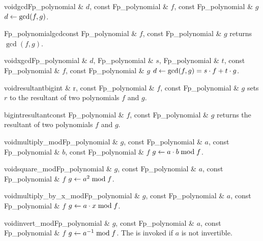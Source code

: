 
\begin{fcode}{void}{gcd}{Fp_polynomial & $d$, const Fp_polynomial & $f$, const Fp_polynomial & $g$}
  $d \leftarrow \gcd(f, g)$.
\end{fcode}

\begin{fcode}{Fp_polynomial}{gcd}{const Fp_polynomial & $f$, const Fp_polynomial & $g$}
  returns $\gcd(f, g)$.
\end{fcode}

\begin{fcode}{void}{xgcd}{Fp_polynomial & $d$, Fp_polynomial & $s$, Fp_polynomial & $t$,
    const Fp_polynomial & $f$, const Fp_polynomial & $g$}%
  $d \leftarrow \gcd(f, g) = s \cdot f + t \cdot g$.
\end{fcode}

\begin{fcode}{void}{resultant}{bigint & r, const Fp_polynomial & $f$, const Fp_polynomial & $g$}
  sets $r$ to the resultant of two polynomials $f$ and $g$.
\end{fcode}

\begin{fcode}{bigint}{resultant}{const Fp_polynomial & $f$, const Fp_polynomial & $g$}
  returns the resultant of two polynomials $f$ and $g$.
\end{fcode}



\begin{fcode}{void}{multiply_mod}{Fp_polynomial & $g$, const Fp_polynomial & $a$,
    const Fp_polynomial & $b$, const Fp_polynomial & $f$}%
  $g \leftarrow a \cdot b \bmod f$.
\end{fcode}

\begin{fcode}{void}{square_mod}{Fp_polynomial & $g$, const Fp_polynomial & $a$, const Fp_polynomial & $f$}
  $g \leftarrow a^2 \bmod f$.
\end{fcode}

\begin{fcode}{void}{multiply_by_x_mod}{Fp_polynomial & $g$, const Fp_polynomial & $a$, const Fp_polynomial & $f$}
  $g \leftarrow a \cdot x \bmod f$.
\end{fcode}

\begin{fcode}{void}{invert_mod}{Fp_polynomial & $g$, const Fp_polynomial & $a$, const Fp_polynomial & $f$}
  $g \leftarrow a^{-1} \bmod f$.  The \LEH is invoked if $a$ is not invertible.
\end{fcode}

